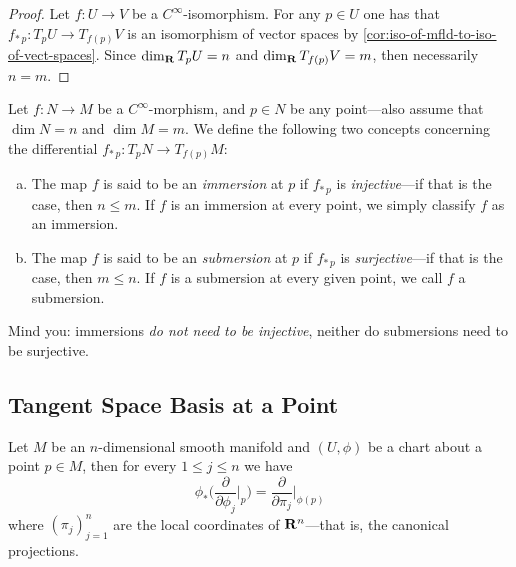 \begin{proof}
Let \(f: U \to V\) be a \(C^{\infty}\)-isomorphism. For any \(p \in U\) one has
that \(f_{*\, p}: T_p U \to T_{f(p)} V\) is an isomorphism of vector spaces by
\cref{cor:iso-of-mfld-to-iso-of-vect-spaces}. Since \(\dim_{\mathbf{R}} T_p U = n\) and
\(\dim_{\mathbf{R}} T_{f(p)} V = m\), then necessarily \(n = m\).
\end{proof}

\begin{definition}
\label{def:immersion-and-submersion}
Let \(f: N \to M\) be a \(C^{\infty}\)-morphism, and \(p \in N\) be any
point---also assume that \(\dim N = n\) and \(\dim M = m\). We define the
following two concepts concerning the differential
\(f_{*\, p}: T_p N \to T_{f(p)} M\):
\begin{enumerate}[(a)]\setlength\itemsep{0em}
\item The map \(f\) is said to be an \emph{immersion} at \(p\) if \(f_{*\, p}\)
  is \emph{injective}---if that is the case, then \(n \leq m\). If \(f\) is an
  immersion at every point, we simply classify \(f\) as an immersion.
\item The map \(f\) is said to be an \emph{submersion} at \(p\) if \(f_{*\, p}\)
  is \emph{surjective}---if that is the case, then \(m \leq n\). If \(f\) is a
  submersion at every given point, we call \(f\) a submersion.
\end{enumerate}
\end{definition}

\begin{remark}
\label{rem:immersion-submersion-not-injective-not-surjective}
Mind you: immersions \emph{do not need to be injective}, neither do
submersions need to be surjective.
\end{remark}

\subsection{Tangent Space Basis at a Point}

\begin{lemma}
\label{lem:tangent-space-basis-lemma}
Let \(M\) be an \(n\)-dimensional smooth manifold and \((U, \phi)\) be a chart
about a point \(p \in M\), then for every \(1 \leq j \leq n\) we have
\[
\phi_{*}\Big( \frac{\partial}{\partial \phi_j}\Big|_p \Big)
= \frac{\partial}{\partial \pi_j} \Big|_{\phi(p)}
\]
where \((\pi_j)_{j=1}^n\) are the local coordinates of \(\mathbf{R}^n\)---that is, the
canonical projections.
\end{lemma}

